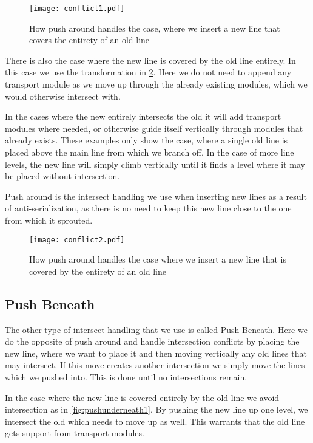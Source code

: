 \begin{figure}[h]
\centering
\texttt{[image: conflict1.pdf]}
\caption{How push around handles the case, where we insert a new line that covers the entirety of an old line}
\label{fig:pusharound1}
\end{figure}

There is also the case where the new line is covered by the old line entirely. In this case we use the transformation in \cref{fig:pusharound2}. Here we do not need to append any transport module as we move up through the already existing modules, which we would otherwise intersect with. 

In the cases where the new entirely intersects the old it will add transport modules where needed, or otherwise guide itself vertically through modules that already exists. These examples only show the case, where a single old line is placed above the main line from which we branch off. In the case of more line levels, the new line will simply climb vertically until it finds a level where it may be placed without intersection. 

Push around is the intersect handling we use when inserting new lines as a result of anti-serialization, as there is no need to keep this new line close to the one from which it sprouted. 

\begin{figure}[H]
\centering
\texttt{[image: conflict2.pdf]}
\caption{How push around handles the case where we insert a new line that is covered by the entirety of an old line}
\label{fig:pusharound2}
\end{figure}

\subsection{Push Beneath} \label{ssec:pbeneath}
The other type of intersect handling that we use is called Push Beneath. Here we do the opposite of push around and handle intersection conflicts by placing the new line, where we want to place it and then moving vertically any old lines that may intersect. If this move creates another intersection we simply move the lines which we pushed into. This is done until no intersections remain. 

In the case where the new line is covered entirely by the old line we avoid intersection as in \cref{fig:pushunderneath1}. By pushing the new line up one level, we intersect the old which needs to move up as well. This warrants that the old line gets support from transport modules.


